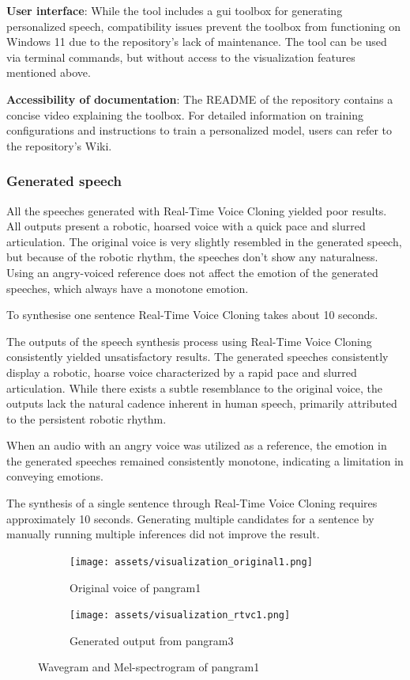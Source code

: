 \textbf{User interface}: While the tool includes a \gls{gui} toolbox for generating personalized speech, compatibility issues prevent the toolbox from functioning on Windows 11 due to the repository's lack of maintenance. The tool can be used via terminal commands, but without access to the visualization features mentioned above.

\textbf{Accessibility of documentation}: The README of the repository\cite{jemine_corentinjreal-time-voice-cloning_2023} contains a concise video explaining the toolbox. For detailed information on training configurations and instructions to train a personalized model, users can refer to the repository's Wiki.

\subsubsection{Generated speech}
All the speeches generated with Real-Time Voice Cloning yielded poor results. All outputs present a robotic, hoarsed voice with a quick pace and slurred articulation. The original voice is very slightly resembled in the generated speech, but because of the robotic rhythm, the speeches don't show any naturalness.
Using an angry-voiced reference does not affect the emotion of the generated speeches, which always have a monotone emotion.

To synthesise one sentence Real-Time Voice Cloning takes about 10 seconds.

The outputs of the speech synthesis process using Real-Time Voice Cloning consistently yielded unsatisfactory results. The generated speeches consistently display a robotic, hoarse voice characterized by a rapid pace and slurred articulation. While there exists a subtle resemblance to the original voice, the outputs lack the natural cadence inherent in human speech, primarily attributed to the persistent robotic rhythm.

When an audio with an angry voice was utilized as a reference, the emotion in the generated speeches remained consistently monotone, indicating a limitation in conveying emotions.

The synthesis of a single sentence through Real-Time Voice Cloning requires approximately 10 seconds. Generating multiple candidates for a sentence by manually running multiple inferences did not improve the result.

\begin{figure}
\centering
\begin{subfigure}{0.49\textwidth}
\centering
\texttt{[image: assets/visualization\_original1.png]}
\caption{Original voice of pangram1}
\label{fig:visualization_original1}
\end{subfigure}
\begin{subfigure}{0.49\textwidth}
\centering
\texttt{[image: assets/visualization\_rtvc1.png]}
\caption{Generated output from pangram3}
\label{fig:visualization_rtvc1}
\end{subfigure}
\caption{Wavegram and Mel-spectrogram of pangram1}
\label{fig:visualization_rtvc}
\end{figure}
